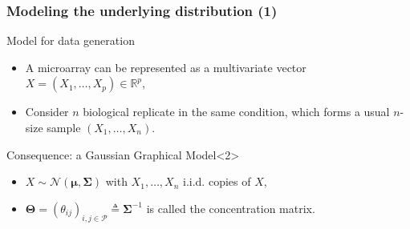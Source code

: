 \begin{frame}
\end{frame}

\begin{frame}
  \frametitle{Modeling the underlying distribution (1)}
  
  \begin{block}{Model for data generation}
    \begin{itemize}
    \item A  microarray   can  be  represented  as   a  multivariate  vector
      $X=(X_1,\dots,X_p)\in\mathbb{R}^p$,
    \item  Consider $n$  biological replicate  in the  same condition,
      which forms a usual $n$-size sample $(X_1,\dots,X_n)$.
    \end{itemize}
  \end{block}
  
  \vfill
  
  \begin{block}{Consequence: a Gaussian Graphical Model}<2>
    \begin{itemize}
    \item   $X\sim\mathcal{N}(\boldsymbol\mu,\boldsymbol\Sigma)$  with
      $X_1,\dots,X_n$ \alert{i.i.d.} copies of $X$,
    \item    $\boldsymbol\Theta    =   (\theta_{ij})_{i,j\in\mathcal{P}}
      \triangleq     {\boldsymbol\Sigma}^{-1}$    is     called    the
      \alert{concentration matrix}.
    \end{itemize}
  \end{block}
\end{frame}
  
